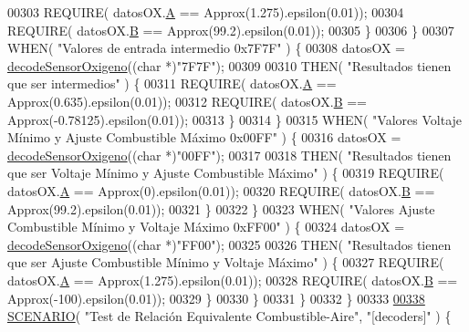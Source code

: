 \begin{DoxyCode}
{00303                 REQUIRE( datosOX.\hyperlink{structOxigenoResponse_a068c403e5746226cf22bb020b4c786d3}{A} == Approx(1.275).epsilon(0.01));
00304                 REQUIRE( datosOX.\hyperlink{structOxigenoResponse_a96b19152dd001e19d1351e2d97f22736}{B} == Approx(99.2).epsilon(0.01));
00305             \}
00306         \}
00307         WHEN( \textcolor{stringliteral}{"Valores de entrada intermedio 0x7F7F"} ) \{
00308             datosOX = \hyperlink{decoders_8cpp_a5b53fc5fc37fbee9c5e389f6c8c18438}{decodeSensorOxigeno}((\textcolor{keywordtype}{char} *)\textcolor{stringliteral}{"7F7F"});
00309 
00310             THEN( \textcolor{stringliteral}{"Resultados tienen que ser intermedios"} ) \{
00311                 REQUIRE( datosOX.\hyperlink{structOxigenoResponse_a068c403e5746226cf22bb020b4c786d3}{A} == Approx(0.635).epsilon(0.01));
00312                 REQUIRE( datosOX.\hyperlink{structOxigenoResponse_a96b19152dd001e19d1351e2d97f22736}{B} == Approx(-0.78125).epsilon(0.01));
00313             \}
00314         \}
00315         WHEN( \textcolor{stringliteral}{"Valores Voltaje Mínimo y Ajuste Combustible Máximo 0x00FF"} ) \{
00316             datosOX = \hyperlink{decoders_8cpp_a5b53fc5fc37fbee9c5e389f6c8c18438}{decodeSensorOxigeno}((\textcolor{keywordtype}{char} *)\textcolor{stringliteral}{"00FF"});
00317 
00318             THEN( \textcolor{stringliteral}{"Resultados tienen que ser Voltaje Mínimo y Ajuste Combustible Máximo"} ) \{
00319                 REQUIRE( datosOX.\hyperlink{structOxigenoResponse_a068c403e5746226cf22bb020b4c786d3}{A} == Approx(0).epsilon(0.01));
00320                 REQUIRE( datosOX.\hyperlink{structOxigenoResponse_a96b19152dd001e19d1351e2d97f22736}{B} == Approx(99.2).epsilon(0.01));
00321             \}
00322         \}
00323         WHEN( \textcolor{stringliteral}{"Valores Ajuste Combustible Mínimo y Voltaje Máximo 0xFF00"} ) \{
00324             datosOX = \hyperlink{decoders_8cpp_a5b53fc5fc37fbee9c5e389f6c8c18438}{decodeSensorOxigeno}((\textcolor{keywordtype}{char} *)\textcolor{stringliteral}{"FF00"});
00325 
00326             THEN( \textcolor{stringliteral}{"Resultados tienen que ser Ajuste Combustible Mínimo y Voltaje Máximo"} ) \{
00327                 REQUIRE( datosOX.\hyperlink{structOxigenoResponse_a068c403e5746226cf22bb020b4c786d3}{A} == Approx(1.275).epsilon(0.01));
00328                 REQUIRE( datosOX.\hyperlink{structOxigenoResponse_a96b19152dd001e19d1351e2d97f22736}{B} == Approx(-100).epsilon(0.01));
00329             \}
00330         \}
00331     \}
00332 \}
00333 
\hyperlink{UnitTestCase_8cpp_ad6f2a6821f17834d70717ea1d0b38dee}{00338} \hyperlink{UnitTestCase_8cpp_aa6afb62ebdd4c3e07996c995f623eb6b}{SCENARIO}( \textcolor{stringliteral}{"Test de Relación Equivalente Combustible-Aire"}, \textcolor{stringliteral}{"[decoders]"} ) \{
}
\end{DoxyCode}
